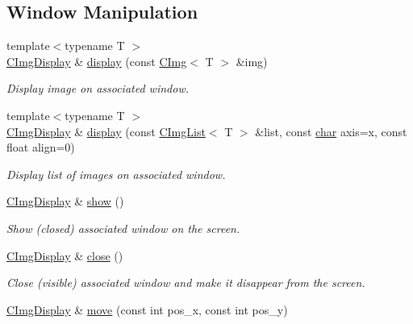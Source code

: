\subsection*{Window Manipulation}
\begin{DoxyCompactItemize}
\item 
{\footnotesize template$<$typename T $>$ }\\\hyperlink{structcimg__library__suffixed_1_1CImgDisplay}{C\+Img\+Display} \& \hyperlink{structcimg__library__suffixed_1_1CImgDisplay_ad08f2f8b85cdd55d5e3ea71bdebf2b67}{display} (const \hyperlink{structcimg__library__suffixed_1_1CImg}{C\+Img}$<$ T $>$ \&img)
\begin{DoxyCompactList}\small\item\em Display image on associated window. \end{DoxyCompactList}\item 
{\footnotesize template$<$typename T $>$ }\\\hyperlink{structcimg__library__suffixed_1_1CImgDisplay}{C\+Img\+Display} \& \hyperlink{structcimg__library__suffixed_1_1CImgDisplay_a7f0ae1e5a6deb128d9a4f9501514675b}{display} (const \hyperlink{structcimg__library__suffixed_1_1CImgList}{C\+Img\+List}$<$ T $>$ \&list, const \hyperlink{classchar}{char} axis=\textquotesingle{}x\textquotesingle{}, const float align=0)
\begin{DoxyCompactList}\small\item\em Display list of images on associated window. \end{DoxyCompactList}\item 
\hyperlink{structcimg__library__suffixed_1_1CImgDisplay}{C\+Img\+Display} \& \hyperlink{structcimg__library__suffixed_1_1CImgDisplay_a40569e73fec12daeec84942b0d0f1b6d}{show} ()
\begin{DoxyCompactList}\small\item\em Show (closed) associated window on the screen. \end{DoxyCompactList}\item 
\hyperlink{structcimg__library__suffixed_1_1CImgDisplay}{C\+Img\+Display} \& \hyperlink{structcimg__library__suffixed_1_1CImgDisplay_ab8b103966af1d6ba45a410d1814e4000}{close} ()
\begin{DoxyCompactList}\small\item\em Close (visible) associated window and make it disappear from the screen. \end{DoxyCompactList}\item 
\hyperlink{structcimg__library__suffixed_1_1CImgDisplay}{C\+Img\+Display} \& \hyperlink{structcimg__library__suffixed_1_1CImgDisplay_aba5d6f1e8a3f1d086ca4defe91aa94a6}{move} (const int pos\+\_\+x, const int pos\+\_\+y)

\end{DoxyCompactItemize}
